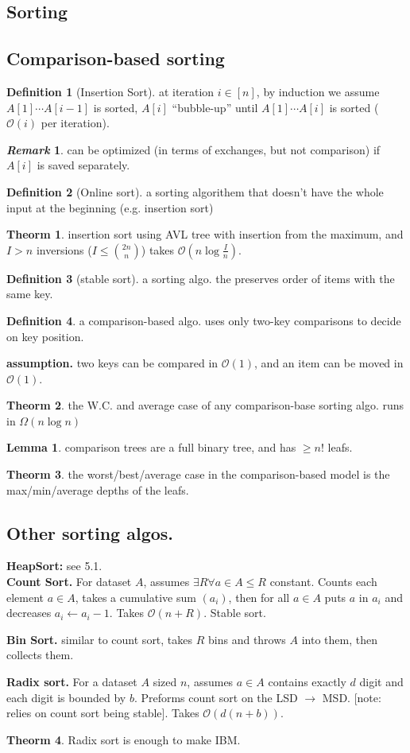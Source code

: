 \documentclass[]{article}
\newcommand\compactsubsection[1]        {\vspace{-10pt}\subsection{#1}\vspace{-6pt}}
\newcommand\compactsection   [1]        {\vspace{-10pt}\section{#1}\vspace{-6pt}}
\newcommand\subsectionrightaftersection {\vspace{10pt}}
\theoremstyle{definition}
\newtheorem{Theorem}{\color{theoColor}Theorm}
\newtheorem{Definition}{\color{defiColor}Definition}
\newtheorem{Lemma}{\color{lemColor}Lemma}
\newtheorem{Remark}{\textit{Remark}}
\newcommand\theo  [1] {\begin{Theorem}#1\end{Theorem}}
\newcommand\defi  [1] {\begin{Definition}#1\end{Definition}}
\newcommand\lem   [1] {\begin{Lemma}#1\end{Lemma}}
\newcommand\oc    {\mathcal{O}}
\newcommand\logn      {\log n}
\newcommand\cl [1]    {\left ( #1 \right )}
\begin{document}
\begin{multicols}{4}
		\compactsection{Sorting}\subsectionrightaftersection
			\compactsubsection{Comparison-based sorting}
				\begin{Definition}[Insertion Sort]
					at iteration $i \in [n]$, by induction we assume $A[1] \cdots A[i - 1]$ is sorted, $A[i]$ ``bubble-up'' until $A[1] \cdots A[i]$ is sorted ($\oc(i)$ per iteration). 
				\end{Definition}
				\begin{Remark}
					can be optimized (in terms of exchanges, but not comparison) if $A[i]$ is saved separately. 
				\end{Remark}
				\begin{Definition}[Online sort]a sorting algorithem that doesn't have the whole input at the beginning (e.g. insertion sort)
				\end{Definition}
				\theo{insertion sort using AVL tree with insertion from the maximum, and $I > n$ inversions ($I \le \binom{2n}{n}$) takes $\oc\cl{n \log \frac{I}{n}}$. }
				\begin{Definition}[stable sort]
					 a sorting algo. the preserves order of items with the same key. 
				\end{Definition}
				\defi{a comparison-based algo. uses only two-key comparisons to decide on key position. }
				\textbf{assumption. }two keys can be compared in $\oc(1)$, and an item can be moved in $\oc(1)$. 
				\theo{the W.C. and average case of any comparison-base sorting algo. runs in $\Omega(n \logn)$}
				\lem{comparison trees are a full binary tree, and has $\ge n!$ leafs. }
				\theo{the worst/best/average case in the comparison-based model is the max/min/average depths of the leafs. }
			\compactsubsection{Other sorting algos. }
				\textbf{HeapSort: }see 5.1. \\
				\textbf{Count Sort. }For dataset $A$, assumes $\exists R \forall a \in A \le R$ constant. Counts each element $a \in A$, takes a cumulative sum $(a_i)$, then for all $a \in A$ puts $a$ in $a_i$ and decreases $a_i \gets a_i - 1$. Takes $\oc(n + R)$. Stable sort. 
				
				\textbf{Bin Sort. }similar to count sort, takes $R$ bins and throws $A$ into them, then collects them. 
				
				\textbf{Radix sort. }For a dataset $A$ sized $n$, assumes $a \in A$ contains exactly $d$ digit and each digit is bounded by $b$. Preforms count sort on the LSD $\to$ MSD. [note: relies on count sort being stable]. Takes $\oc(d(n + b))$. 
				
				\theo{Radix sort is enough to make IBM. }
				

\end{multicols}
\end{document}
